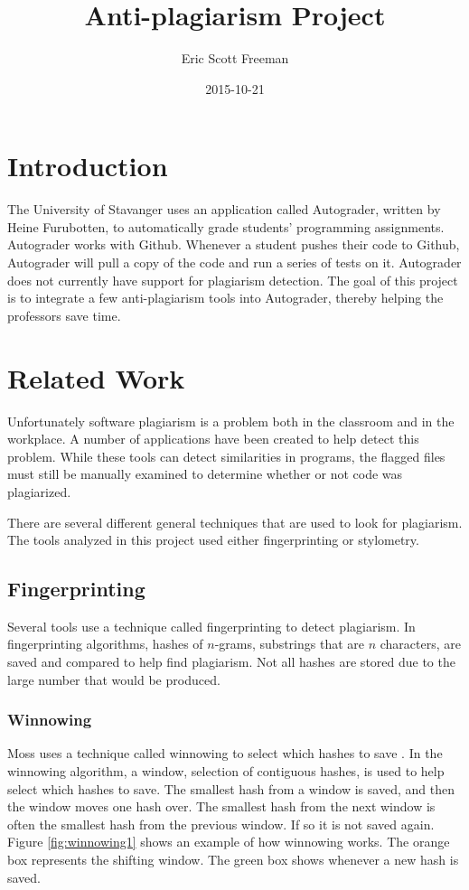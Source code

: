 \documentclass[12pt]{article}
\title{Anti-plagiarism Project}
\date{2015-10-21}
\author{Eric Scott Freeman}
\begin{document}
	\maketitle
	\newpage
	\tableofcontents
	\newpage
	\section{Introduction}
		The University of Stavanger uses an application called Autograder, written by Heine Furubotten, to automatically grade students' programming assignments. Autograder works with Github. Whenever a student pushes their code to Github, Autograder will pull a copy of the code and run a series of tests on it. Autograder does not currently have support for plagiarism detection. The goal of this project is to integrate a few anti-plagiarism tools into Autograder, thereby helping the professors save time.
		
	\section{Related Work}
		Unfortunately software plagiarism is a problem both in the classroom and in the workplace. A number of applications have been created to help detect this problem. While these tools can detect similarities in programs, the flagged files must still be manually examined to determine whether or not code was plagiarized.
		
		There are several different general techniques that are used to look for plagiarism. The tools analyzed in this project used either fingerprinting or stylometry.
	
		\subsection{Fingerprinting}
			Several tools use a technique called fingerprinting to detect plagiarism. In fingerprinting algorithms, hashes of $n$-grams, substrings that are $n$ characters, are saved and compared to help find plagiarism. Not all hashes are stored due to the large number that would be produced. 
		
			\subsubsection{Winnowing}
				Moss uses a technique called winnowing to select which hashes to save \cite{schleimer+wilkerson+aiken}. In the winnowing algorithm, a window, selection of contiguous hashes, is used to help select which hashes to save. The smallest hash from a window is saved, and then the window moves one hash over. The smallest hash from the next window is often the smallest hash from the previous window. If so it is not saved again. Figure \ref{fig:winnowing1} shows an example of how winnowing works. The orange box represents the shifting window. The green box shows whenever a new hash is saved.
				
\end{document}

